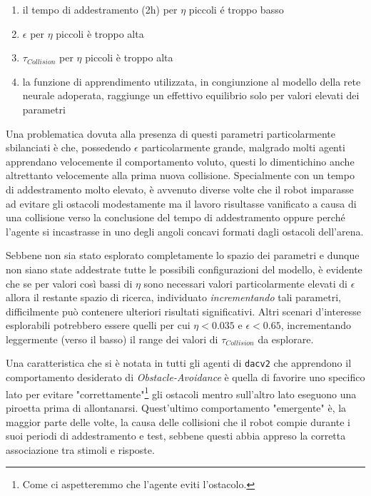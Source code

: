 \begin{enumerate}
    \item il tempo di addestramento (2h) per $\eta$ piccoli é troppo basso 
    \item $\epsilon$ per $\eta$ piccoli è troppo alta
    \item $\tau_{Collision}$ per $\eta$ piccoli è troppo alta
    \item la funzione di apprendimento utilizzata, in congiunzione al modello della rete neurale adoperata, raggiunge un effettivo equilibrio solo per valori elevati dei parametri
\end{enumerate} 

Una problematica dovuta alla presenza di questi parametri particolarmente sbilanciati è che, possedendo $\epsilon$ particolarmente grande, malgrado molti agenti apprendano velocemente il comportamento voluto, questi lo dimentichino anche altrettanto velocemente alla prima nuova collisione. Specialmente con un tempo di addestramento molto elevato, è avvenuto diverse volte che il robot imparasse ad evitare gli ostacoli modestamente ma il lavoro risultasse vanificato a causa di una collisione verso la conclusione del tempo di addestramento oppure perché l'agente si incastrasse in uno degli angoli concavi formati dagli ostacoli dell'arena.

Sebbene non sia stato esplorato completamente lo spazio dei parametri e dunque non siano state addestrate tutte le possibili configurazioni del modello, è evidente che se per valori così bassi di $\eta$ sono necessari valori particolarmente elevati di $\epsilon$ allora il restante spazio di ricerca, individuato \textit{incrementando} tali parametri, difficilmente può contenere ulteriori risultati significativi.
Altri scenari d'interesse esplorabili potrebbero essere quelli per cui $\eta < 0.035$ e $\epsilon < 0.65$, incrementando leggermente (verso il basso) il range dei valori di $\tau_{Collision}$ da esplorare.

Una caratteristica che si è notata in tutti gli agenti di \texttt{dacv2} che apprendono il comportamento desiderato di \textit{Obstacle-Avoidance} è quella di favorire uno specifico lato per evitare "correttamente"\footnote{Come ci aspetteremmo che l'agente eviti l'ostacolo.} gli ostacoli mentro sull'altro lato eseguono una piroetta prima di allontanarsi. Quest'ultimo comportamento "emergente" è, la maggior parte delle volte, la causa delle collisioni che il robot compie durante i suoi periodi di addestramento e test, sebbene questi abbia appreso la corretta associazione tra stimoli e risposte.

